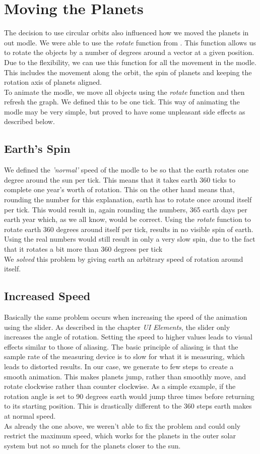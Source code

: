 \chapter{Moving the Planets}
The decision to use circular orbits also influenced how we moved the planets in out modle. We were able to use the {\em rotate} function from \matlab{}. This function allows us to rotate the objects by a number of degrees around a vector at a given position. Due to the flexibility, we can use this function for all the movement in the modle. This includes the movement along the orbit, the spin of planets and keeping the rotation axis of planets aligned.\\

To animate the modle, we move all objects using the {\em rotate} function and then refresh the graph. We defined this to be one tick. This way of animating the modle may be very simple, but proved to have some unpleasant side effects as described below.

\section{Earth's Spin}
We defined the {\em 'normal'} speed of the modle to be so that the earth rotates one degree around the sun per tick. This means that it takes earth 360 ticks to complete one year's worth of rotation. This on the other hand means that, rounding the number for this explanation, earth has to rotate once around itself per tick. This would result in, again rounding the numbers, 365 earth days per earth year which, as we all know, would be correct. Using the {\em rotate} function to rotate earth 360 degrees around itself per tick, results in no visible spin of earth. Using the real numbers would still result in only a very slow spin, due to the fact that it rotates a bit more than 360 degrees per tick\\

We {\em solved} this problem by giving earth an arbitrary speed of rotation around itself.


\section{Increased Speed}
Basically the same problem occurs when increasing the speed of the animation using the slider. As described in the chapter {\em UI Elements}, the slider only increases the angle of rotation. Setting the speed to higher values leads to visual effects similar to those of aliasing. The basic principle of aliasing is that the sample rate of the measuring device is to slow for what it is measuring, which leads to distorted results. In our case, we generate to few steps to create a smooth animation. This makes planets jump, rather than smoothly move, and rotate clockwise rather than counter clockwise. As a simple example, if  the rotation angle is set to 90 degrees earth would jump three times before returning to its starting position. This is drastically different to the 360 steps earth makes at normal speed. \\

As already the one above, we weren't able to fix the problem and could only restrict the maximum speed, which works for the planets in the outer solar system but not so much for the planets closer to the sun.